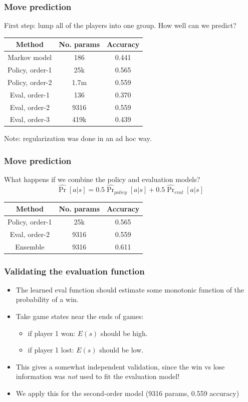 \documentclass{beamer}
\begin{document}
\begin{frame}
\frametitle{Move prediction}
First step: lump all of the players into one group.  How well can we predict?
\begin{center}
\begin{tabular}{c|c|c}\hline
Method & No. params & Accuracy\\ \hline
Markov model & 186 & 0.441 \\\hline
Policy, order-1 & 25k & 0.565 \\ \hline
Policy, order-2 & 1.7m & 0.559 \\ \hline
Eval, order-1 & 136 & 0.370 \\ \hline
Eval, order-2 & 9316 & 0.559 \\ \hline
Eval, order-3 & 419k & 0.439 \\ \hline
\end{tabular}
\end{center}
Note: regularization was done in an ad hoc way.
\end{frame}

\begin{frame}
\frametitle{Move prediction}
What happens if we combine the policy and evaluation models?
\[
\hat{\Pr}[a|s] = 0.5 \hat{\Pr}_{policy}[a|s] + 0.5 \hat{\Pr}_{eval}[a|s]
\]
\begin{center}
\begin{tabular}{c|c|c}\hline
Method & No. params & Accuracy\\ \hline
Policy, order-1 & 25k & 0.565 \\ \hline
Eval, order-2 & 9316 & 0.559 \\ \hline
Ensemble & 9316 & 0.611 \\ \hline
\end{tabular}
\end{center}
\end{frame}

\begin{frame}
\frametitle{Validating the evaluation function}
\begin{itemize}
\item The learned eval function should estimate some monotonic function of the probability of a win.
\item Take game states near the ends of games:
\begin{itemize}
\item if player 1 won: $E(s)$ should be high.
\item if player 1 lost: $E(s)$ should be low.
\end{itemize}
\item This gives a somewhat independent validation, since the win vs lose information was \emph{not} used to fit the evaluation model!
\item We apply this for the second-order model (9316 params, 0.559 accuracy)
\end{itemize}
\end{frame}
\end{document}
